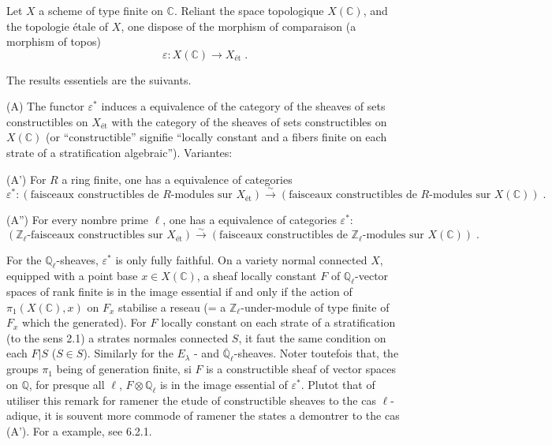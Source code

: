 \documentclass[12pt,a4paper]{article}
\theoremstyle{plain}
\theoremstyle{definition}
\theoremstyle{remark}
\newcommand{\CC}{\mathbb{C}}
\newcommand{\QQ}{\mathbb{Q}}
\newcommand{\ZZ}{\mathbb{Z}}
\begin{document}
\subsubsection{}
Let $X$ a scheme of type finite on $\CC$. Reliant the space topologique $X(\CC)$, and the topologie étale of $X$, one dispose of the morphism of comparaison (a morphism of topos)
\[
\varepsilon: X(\CC) \longrightarrow X_{\text{\'et}}\;.
\]

The results essentiels are the suivants.

\medskip
(A) The functor $\varepsilon^*$ induces a equivalence of the category of the sheaves of sets constructibles on $X_{\text{\'et}}$ with the category of the sheaves of sets constructibles on $X(\CC)$ (or ``constructible'' signifie ``locally constant and a fibers finite on each strate of a stratification algebraic''). Variantes:

\medskip
(A') For $R$ a ring finite, one has a equivalence of categories
\[
\varepsilon^*: (\text{faisceaux constructibles de } R\text{-modules sur } X_{\text{\'et}}) \xrightarrow{\sim} (\text{faisceaux constructibles de } R\text{-modules sur } X(\CC))\;.
\]

(A'') For every nombre prime $\ell$, one has a equivalence of categories $\varepsilon^*$:
\[
(\ZZ_{\ell}\text{-faisceaux constructibles sur } X_{\text{\'et}}) \xrightarrow{\sim} (\text{faisceaux constructibles de } \ZZ_{\ell}\text{-modules sur } X(\CC))\;.
\]

For the $\QQ_{\ell}$-sheaves, $\varepsilon^*$ is only fully faithful. On a variety normal connected $X$, equipped with a point base $x \in X(\CC)$, a sheaf locally constant $F$ of $\QQ_{\ell}$-vector spaces of rank finite is in the image essential if and only if the action of $\pi_1(X(\CC), x)$ on $F_x$ stabilise a reseau (= a $\ZZ_{\ell}$-under-module of type finite of $F_x$ which the generated). For $F$ locally constant on each strate of a stratification (to the sens 2.1) a strates normales connected $S$, it faut the same condition on each $F|S$ ($S \in S$). Similarly for the $E_{\lambda}$ - and $\overline{\QQ}_{\ell}$-sheaves. Noter toutefois that, the groups $\pi_1$ being of generation finite, si $F$ is a constructible sheaf of vector spaces on $\QQ$, for presque all $\ell$, $F \otimes \QQ_{\ell}$ is in the image essential of $\varepsilon^*$. Plutot that of utiliser this remark for ramener the etude of constructible sheaves to the cas $\ell$-adique, it is souvent more commode of ramener the states a demontrer to the cas (A'). For a example, see 6.2.1.
\end{document}
